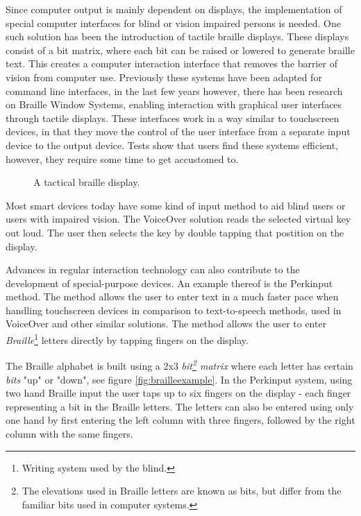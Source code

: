 Since computer output is mainly dependent on displays, the implementation of special computer interfaces for blind or vision impaired persons is needed. One such solution has been the introduction of tactile braille displays. These displays consist of a bit matrix, where each bit can be raised or lowered to generate braille text. This creates a computer interaction interface that removes the barrier of vision from computer use. Previously these systems have been adapted for command line interfaces, in the last few years however, there has been research on Braille Window Systems, enabling interaction with graphical user interfaces through tactile displays\cite{prescher2010tactile}\cite{conf/petra/SturmSKJ09}. These interfaces work in a way similar to touchscreen devices, in that they move the control of the user interface from a separate input device to the output device. Tests show that users find these systems efficient, however, they require some time to get accustomed to.

\begin{figure}[h!]
\caption{A tactical braille display.}
\label{brailledisplay}
\end{figure}
\nocite{brailledisplay}


Most smart devices today have some kind of input method to aid blind users or users with impaired vision. The VoiceOver solution reads the selected virtual key out loud. The user then selects the key by double tapping that postition on the display\cite{voiceover}.

Advances in regular interaction technology can also contribute to the development of special-purpose devices. An example thereof is the Perkinput method\cite{azenkot}. The method allows the user to enter text in a much faster pace when handling touchscreen devices in comparison to text-to-speech methods, used in VoiceOver and other similar solutions. The method allows the user to enter \emph{Braille}\footnote{Writing system used by the blind.} letters directly by tapping fingers on the display.

The Braille alphabet is built using a 2x3 \emph{bit\footnote{The elevations used in Braille letters are known as bits, but differ from the familiar bits used in computer systems.} matrix} where each letter has certain \emph{bits} "up" or "down", see figure \ref{fig:brailleexample}. In the Perkinput system, using two hand Braille input the user taps up to six fingers on the display - each finger representing a bit in the Braille letters. The letters can also be entered using only one hand by first entering the left column with three fingers, followed by the right column with the same fingers.

